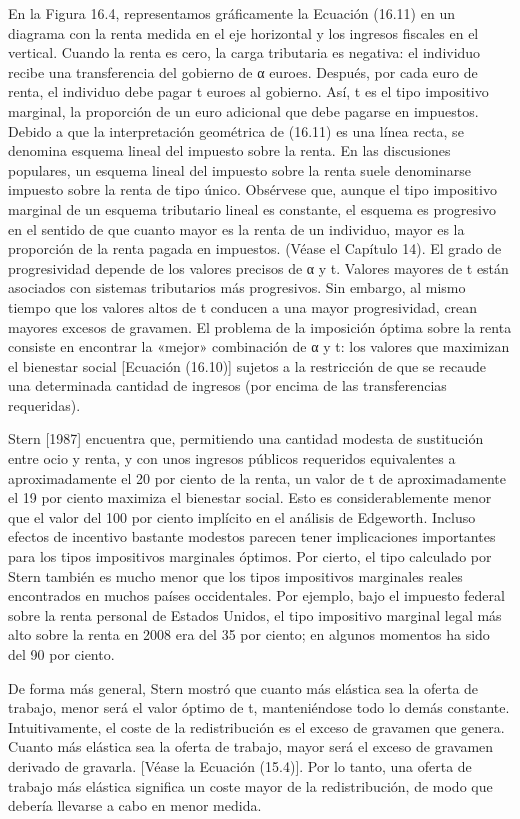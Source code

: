 \documentclass[10pt,a4paper]{article}
\begin{document}
En la Figura 16.4, representamos gráficamente la Ecuación (16.11) en un diagrama con la renta medida en el eje horizontal y los ingresos fiscales en el vertical. Cuando la renta es cero, la carga tributaria es negativa: el individuo recibe una transferencia del gobierno de α euroes. Después, por cada euro de renta, el individuo debe pagar t euroes al gobierno. Así, t es el tipo impositivo marginal, la proporción de un euro adicional que debe pagarse en impuestos. Debido a que la interpretación geométrica de (16.11) es una línea recta, se denomina esquema lineal del impuesto sobre la renta. En las discusiones populares, un esquema lineal del impuesto sobre la renta suele denominarse impuesto sobre la renta de tipo único. Obsérvese que, aunque el tipo impositivo marginal de un esquema tributario lineal es constante, el esquema es progresivo en el sentido de que cuanto mayor es la renta de un individuo, mayor es la proporción de la renta pagada en impuestos. (Véase el Capítulo 14). El grado de progresividad depende de los valores precisos de α y t. Valores mayores de t están asociados con sistemas tributarios más progresivos. Sin embargo, al mismo tiempo que los valores altos de t conducen a una mayor progresividad, crean mayores excesos de gravamen. El problema de la imposición óptima sobre la renta consiste en encontrar la «mejor» combinación de α y t: los valores que maximizan el bienestar social [Ecuación (16.10)] sujetos a la restricción de que se recaude una determinada cantidad de ingresos (por encima de las transferencias requeridas).

Stern [1987] encuentra que, permitiendo una cantidad modesta de sustitución entre ocio y renta, y con unos ingresos públicos requeridos equivalentes a aproximadamente el 20 por ciento de la renta, un valor de t de aproximadamente el 19 por ciento maximiza el bienestar social. Esto es considerablemente menor que el valor del 100 por ciento implícito en el análisis de Edgeworth. Incluso efectos de incentivo bastante modestos parecen tener implicaciones importantes para los tipos impositivos marginales óptimos. Por cierto, el tipo calculado por Stern también es mucho menor que los tipos impositivos marginales reales encontrados en muchos países occidentales. Por ejemplo, bajo el impuesto federal sobre la renta personal de Estados Unidos, el tipo impositivo marginal legal más alto sobre la renta en 2008 era del 35 por ciento; en algunos momentos ha sido del 90 por ciento.

De forma más general, Stern mostró que cuanto más elástica sea la oferta de trabajo, menor será el valor óptimo de t, manteniéndose todo lo demás constante. Intuitivamente, el coste de la redistribución es el exceso de gravamen que genera. Cuanto más elástica sea la oferta de trabajo, mayor será el exceso de gravamen derivado de gravarla. [Véase la Ecuación (15.4)]. Por lo tanto, una oferta de trabajo más elástica significa un coste mayor de la redistribución, de modo que debería llevarse a cabo en menor medida.
\end{document}
